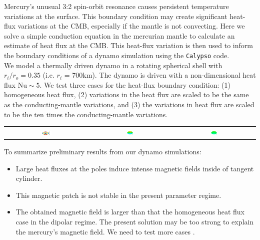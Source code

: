 \documentclass[landscape,a0b,final]{a0poster}
\begin{document}
\begin{multicols}{3}
Mercury's unusual 3:2 spin-orbit resonance causes persistent temperature variations at the surface.  This boundary condition may create significant heat-flux variations at the CMB, especially if the mantle is not convecting.  Here we solve a simple conduction equation in the mercurian mantle to calculate an estimate of heat flux at the CMB.  This heat-flux variation is then used to inform the boundary conditions of a dynamo simulation using the \texttt{Calypso} code.
\\
We model a thermally driven dynamo in a rotating spherical shell with $r_{i}/r_{o} = 0.35$ (i.e.  $r_i$ = 700km).  The dynamo is driven with a non-dimensional heat flux $\mathrm{Nu} \sim 5$.  We test three cases for the heat-flux boundary condition: (1) homogeneous heat flux, (2) variations in the heat flux are scaled to be the same as the conducting-mantle variations, and (3) the variations in heat flux are scaled to be the ten times the conducting-mantle variations.
\begin{center}
\begin{tabular}{ccc}
 \includegraphics[width=0.14\textwidth]{CMB_flux.pdf} &
 \includegraphics[width=0.08\textwidth]{br_cmb_x0.png} &
 \includegraphics[width=0.08\textwidth]{br_cmb_x10.png}
\end{tabular}
\label{dynamo}
\end{center}

To summarize preliminary results from our dynamo simulations:
\begin{itemize}
\item Large heat fluxes at the poles induce intense magnetic fields inside of tangent cylinder.
\item This magnetic patch is not stable in the present parameter regime.
\item The obtained magnetic field is larger than that  the homogeneous heat flux case in the dipolar regime. The present solution may be too strong to explain the mercury's magnetic field. We need to test more cases .
\end{itemize}


\end{multicols}
\end{document}

